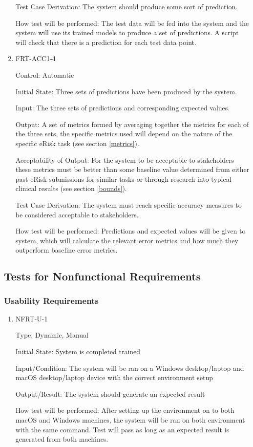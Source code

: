 \documentclass[12pt, titlepage]{article}
\begin{document}
\begin{enumerate}
Test Case Derivation: The system should produce some sort of prediction.

How test will be performed: The test data will be fed into the system and the system will use its trained models to produce a set of predictions. A script will check that there is a prediction for each test data point.

\item{FRT-ACC1-4\\}

Control: Automatic

Initial State: Three sets of predictions have been produced by the system.

Input: The three sets of predictions and corresponding expected values.

Output: A set of metrics formed by averaging together the metrics for each of the three sets, the specific metrics used will depend on the nature of the specific eRisk task (see section \ref{metrics}).

Acceptability of Output: For the system to be acceptable to stakeholders these metrics must be better than some baseline value determined from either past eRisk submissions for similar tasks or through research into typical clinical results (see section \ref{bounds}).

Test Case Derivation: The system must reach specific accuracy measures to be considered acceptable to stakeholders.

How test will be performed: Predictions and expected values will be given to system, which will calculate the relevant error metrics and how much they outperform baseline error metrics.

\end{enumerate}

\subsection{Tests for Nonfunctional Requirements}
\subsubsection{Usability Requirements}
		

\begin{enumerate}

\item{NFRT-U-1\\}

Type: Dynamic, Manual
					
Initial State: System is completed trained
					
Input/Condition: The system will be ran on a Windows desktop/laptop and macOS desktop/laptop device with the correct environment setup
					
Output/Result: The system should generate an expected result 
					
How test will be performed: After setting up the environment on to both macOS and Windows machines, the system will be ran on both environment with the same command. Test will pass as long as an expected result is generated from both machines.


\end{enumerate}
\end{document}
